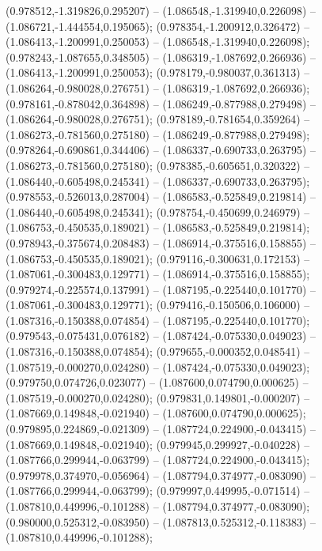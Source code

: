  (0.978512,-1.319826,0.295207) -- (1.086548,-1.319940,0.226098) -- (1.086721,-1.444554,0.195065);
 (0.978354,-1.200912,0.326472) -- (1.086413,-1.200991,0.250053) -- (1.086548,-1.319940,0.226098);
 (0.978243,-1.087655,0.348505) -- (1.086319,-1.087692,0.266936) -- (1.086413,-1.200991,0.250053);
 (0.978179,-0.980037,0.361313) -- (1.086264,-0.980028,0.276751) -- (1.086319,-1.087692,0.266936);
 (0.978161,-0.878042,0.364898) -- (1.086249,-0.877988,0.279498) -- (1.086264,-0.980028,0.276751);
 (0.978189,-0.781654,0.359264) -- (1.086273,-0.781560,0.275180) -- (1.086249,-0.877988,0.279498);
 (0.978264,-0.690861,0.344406) -- (1.086337,-0.690733,0.263795) -- (1.086273,-0.781560,0.275180);
 (0.978385,-0.605651,0.320322) -- (1.086440,-0.605498,0.245341) -- (1.086337,-0.690733,0.263795);
 (0.978553,-0.526013,0.287004) -- (1.086583,-0.525849,0.219814) -- (1.086440,-0.605498,0.245341);
 (0.978754,-0.450699,0.246979) -- (1.086753,-0.450535,0.189021) -- (1.086583,-0.525849,0.219814);
 (0.978943,-0.375674,0.208483) -- (1.086914,-0.375516,0.158855) -- (1.086753,-0.450535,0.189021);
 (0.979116,-0.300631,0.172153) -- (1.087061,-0.300483,0.129771) -- (1.086914,-0.375516,0.158855);
 (0.979274,-0.225574,0.137991) -- (1.087195,-0.225440,0.101770) -- (1.087061,-0.300483,0.129771);
 (0.979416,-0.150506,0.106000) -- (1.087316,-0.150388,0.074854) -- (1.087195,-0.225440,0.101770);
 (0.979543,-0.075431,0.076182) -- (1.087424,-0.075330,0.049023) -- (1.087316,-0.150388,0.074854);
 (0.979655,-0.000352,0.048541) -- (1.087519,-0.000270,0.024280) -- (1.087424,-0.075330,0.049023);
 (0.979750,0.074726,0.023077) -- (1.087600,0.074790,0.000625) -- (1.087519,-0.000270,0.024280);
 (0.979831,0.149801,-0.000207) -- (1.087669,0.149848,-0.021940) -- (1.087600,0.074790,0.000625);
 (0.979895,0.224869,-0.021309) -- (1.087724,0.224900,-0.043415) -- (1.087669,0.149848,-0.021940);
 (0.979945,0.299927,-0.040228) -- (1.087766,0.299944,-0.063799) -- (1.087724,0.224900,-0.043415);
 (0.979978,0.374970,-0.056964) -- (1.087794,0.374977,-0.083090) -- (1.087766,0.299944,-0.063799);
 (0.979997,0.449995,-0.071514) -- (1.087810,0.449996,-0.101288) -- (1.087794,0.374977,-0.083090);
 (0.980000,0.525312,-0.083950) -- (1.087813,0.525312,-0.118383) -- (1.087810,0.449996,-0.101288);
